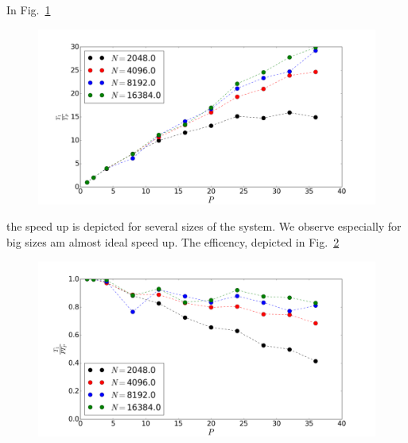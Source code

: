 In Fig.~\ref{fig:speedup}\begin{figure}[h] 
  \centering
     \includegraphics[width=\textwidth]{pic/speedup.png}
  \caption{}
  \label{fig:speedup}
\end{figure} the speed up is depicted for several sizes of the system. We observe especially for big sizes am almost ideal speed up. The efficency, depicted in Fig.~\ref{fig:efficency}\begin{figure}[h] 
  \centering
     \includegraphics[width=\textwidth]{pic/efficency.png}
  \caption{}
  \label{fig:efficency}

\end{figure}
